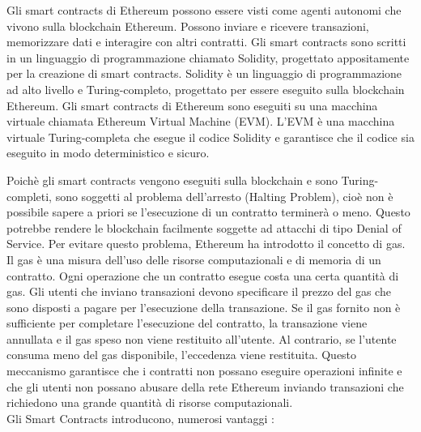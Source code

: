 \documentclass[../../Thesis.tex]{subfiles}
\begin{document}
Gli smart contracts di Ethereum possono essere visti come agenti autonomi che vivono sulla blockchain Ethereum. Possono inviare e ricevere transazioni, memorizzare dati e interagire con altri contratti. Gli smart contracts sono scritti in un linguaggio di programmazione chiamato Solidity, progettato appositamente per la creazione di smart contracts. Solidity \`e un linguaggio di programmazione ad alto livello e Turing-completo, progettato per essere eseguito sulla blockchain Ethereum. Gli smart contracts di Ethereum sono eseguiti su una macchina virtuale chiamata Ethereum Virtual Machine (EVM). L'EVM \`e una macchina virtuale Turing-completa che esegue il codice Solidity e garantisce che il codice sia eseguito in modo deterministico e sicuro.

Poich\`e gli smart contracts vengono eseguiti sulla blockchain e sono Turing-completi, sono soggetti al problema dell'arresto (Halting Problem), cio\`e non \`e possibile sapere a priori se l'esecuzione di un contratto terminer\`a o meno. Questo potrebbe rendere le blockchain facilmente soggette ad attacchi di tipo Denial of Service. Per evitare questo problema, Ethereum ha introdotto il concetto di gas. Il gas \`e una misura dell'uso delle risorse computazionali e di memoria di un contratto. Ogni operazione che un contratto esegue costa una certa quantit\`a di gas. Gli utenti che inviano transazioni devono specificare il prezzo del gas che sono disposti a pagare per l'esecuzione della transazione. Se il gas fornito non \`e sufficiente per completare l'esecuzione del contratto, la transazione viene annullata e il gas speso non viene restituito all'utente. Al contrario, se l'utente consuma meno del gas disponibile, l'eccedenza viene restituita. Questo meccanismo garantisce che i contratti non possano eseguire operazioni infinite e che gli utenti non possano abusare della rete Ethereum inviando transazioni che richiedono una grande quantit\`a di risorse computazionali.\\
Gli Smart Contracts introducono, numerosi vantaggi \cite{SCReview}:
\end{document}
